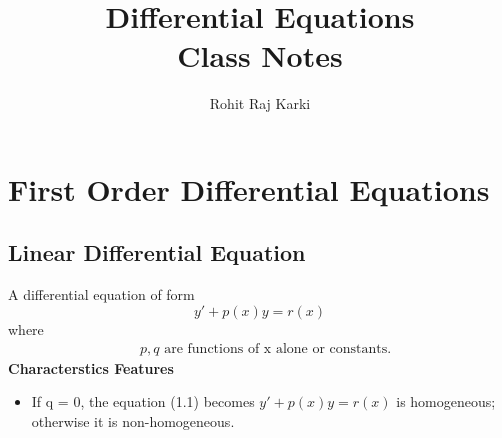 \documentclass{report}
\title{\Huge{Differential Equations}\\Class Notes}
\author{\huge{Rohit Raj Karki}}
\date{}
\begin{document}
\maketitle
\newpage%
\tableofcontents
\pagebreak

\chapter{First Order Differential Equations}
\section{Linear Differential Equation}
A differential equation of form \begin{equation}y'+p(x)y = r(x)
\end{equation}
where 
\begin{align*}
      & p,q\text{ are functions of x alone or constants.}                                                                        
\end{align*}  
 \parinf
 \textbf{Characterstics Features}
\begin{itemize}
\item If q = 0, the equation (1.1) becomes $y'+p(x)y = r(x) $ is homogeneous; otherwise it is
non-homogeneous.
\end{itemize}
\end{document}
